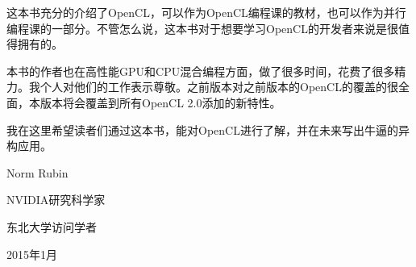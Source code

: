 这本书充分的介绍了OpenCL，可以作为OpenCL编程课的教材，也可以作为并行编程课的一部分。不管怎么说，这本书对于想要学习OpenCL的开发者来说是很值得拥有的。

本书的作者也在高性能GPU和CPU混合编程方面，做了很多时间，花费了很多精力。我个人对他们的工作表示尊敬。之前版本对之前版本的OpenCL的覆盖的很全面，本版本将会覆盖到所有OpenCL 2.0添加的新特性。

我在这里希望读者们通过这本书，能对OpenCL进行了解，并在未来写出牛逼的异构应用。

\myRefRule

\begin{mySign}

Norm Rubin

NVIDIA研究科学家

东北大学访问学者

2015年1月

\end{mySign}
